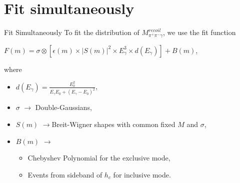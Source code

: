 \documentclass{beamer}
\begin{document}
\section{Fit simultaneously}
\begin{frame}{Fit Simultaneously}
    To fit the distribution of $M^{recoil}_{\pi^+\pi^-\gamma}$, we use the fit function\\
    \begin{center}
        $F(m) = \sigma\otimes[\epsilon(m)\times|S(m)|^2\times E^3_{\gamma}\times d(E_{\gamma})] + B(m)$,
    \end{center}
    where
    \begin{itemize}
        \item $d(E_{\gamma}) = \frac{E^2_0}{E_{\gamma}E_0 + ( E_{\gamma}-E_0 )^2}$,\\
        \item $\sigma$ $\rightarrow$ Double-Gaussians,
        \item $S(m)$ $\rightarrow $Breit-Wigner shapes with common fixed $M$ and $\sigma$,
        \item $B(m)$ $\rightarrow $
            \begin{itemize}
                \item Chebyshev Polynomial for the exclusive mode,
                \item Events from sideband of $h_c$ for inclusive mode.
            \end{itemize}
    \end{itemize}
\end{frame}

\end{document}

